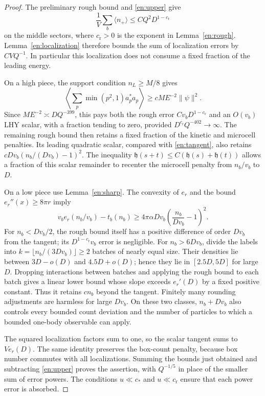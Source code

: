\begin{proof}
The preliminary rough bound and \eqref{en:upper} give
\begin{equation}\label{en:preliminary-number}
 \frac1V\sum_b\langle n_+\rangle\le CQ^2D^{1-c_{\mathrm r}}
\end{equation}
on the middle sectors, where $c_{\mathrm r}>0$ is the exponent in
Lemma~\ref{en:rough}.  Lemma~\ref{en:localization} therefore bounds the
sum of localization errors by $CVQ^{-1}$.  In particular this
localization does not consume a fixed fraction of the leading energy.

On a high piece, the support condition $n_L\ge M/8$ gives
\[
 \left\langle\sum_p\min(p^2,1)a_p^*a_p\right\rangle
       \ge cME^{-2}\|\psi\|^2.
\]
Since
$ME^{-2}\asymp DQ^{-399}$, this pays both the rough error
$Cv_bD^{1-c_{\mathrm r}}$ and an $O(v_b)$ LHY scalar, with a fraction tending to
zero, provided $D^{c_{\mathrm r}}Q^{-402}\to\infty$.  The remaining rough bound
then retains a fixed fraction of the kinetic and microcell penalties.
Its leading quadratic scalar, compared with \eqref{en:tangent}, also
retains $cDv_b(n_b/(Dv_b)-1)^2$.  The inequality
$\mathfrak h(s+t)\le C(\mathfrak h(s)+\mathfrak h(t))$ allows a fraction
of this scalar remainder to recenter the microcell penalty from
$n_b/v_b$ to $D$.

On a low piece use Lemma~\ref{en:sharp}.  The convexity of $e_r$ and the
bound $e_r''(x)\ge8\pi r$ imply
\begin{equation}\label{en:scalar-convexity}
 v_be_r(n_b/v_b)-t_b(n_b)
       \ge4\pi\alpha Dv_b\left(\frac{n_b}{Dv_b}-1\right)^2.
\end{equation}
For $n_b<Dv_b/2$, the rough bound itself has a positive difference of
order $Dv_b$ from the tangent; its $D^{1-c_{\mathrm r}}v_b$ error is negligible.
For $n_b>6Dv_b$, divide the labels into
$k=\lfloor n_b/(3Dv_b)\rfloor\ge2$ batches of nearly equal size.
Their densities lie between $3D-o(D)$ and $4.5D+o(D)$; hence they lie
in $[2.5D,5D]$ for large $D$.  Dropping interactions
between batches and applying the rough bound to each batch gives a
linear lower bound whose slope exceeds $e_r'(D)$ by a fixed positive
constant.  Thus it retains $c n_b$ beyond the tangent.  Finitely many
rounding adjustments are harmless for large $Dv_b$.  On these two
classes, $n_b+Dv_b$ also controls every bounded count deviation and the
number of particles to which a bounded one-body observable can apply.

The squared localization factors sum to one, so the scalar tangent sums
to $Ve_r(D)$.  The same identity preserves the box-count penalty, because
box number commutes with all localizations.  Summing the bounds just
obtained and subtracting \eqref{en:upper} proves the assertion, with
$Q^{-1/5}$ in place of the smaller sum of error powers.  The conditions
$u\ll c_*$ and $u\ll c_{\mathrm r}$ ensure that each power error is absorbed.
\end{proof}

